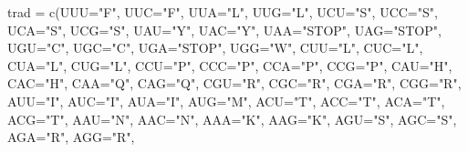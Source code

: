 \documentclass[
]{article}
\newenvironment{Shaded}{\begin{snugshade}}{\end{snugshade}}
\newcommand{\AttributeTok}[1]{\textcolor[rgb]{0.77,0.63,0.00}{#1}}
\newcommand{\FunctionTok}[1]{\textcolor[rgb]{0.00,0.00,0.00}{#1}}
\newcommand{\NormalTok}[1]{#1}
\newcommand{\OtherTok}[1]{\textcolor[rgb]{0.56,0.35,0.01}{#1}}
\newcommand{\StringTok}[1]{\textcolor[rgb]{0.31,0.60,0.02}{#1}}
\begin{document}
\newpage{}

\begin{Shaded}
\begin{Highlighting}[]
\NormalTok{trad }\OtherTok{=}    \FunctionTok{c}\NormalTok{(}\AttributeTok{UUU=}\StringTok{"F"}\NormalTok{, }\AttributeTok{UUC=}\StringTok{"F"}\NormalTok{, }\AttributeTok{UUA=}\StringTok{"L"}\NormalTok{, }\AttributeTok{UUG=}\StringTok{"L"}\NormalTok{,}
            \AttributeTok{UCU=}\StringTok{"S"}\NormalTok{, }\AttributeTok{UCC=}\StringTok{"S"}\NormalTok{, }\AttributeTok{UCA=}\StringTok{"S"}\NormalTok{, }\AttributeTok{UCG=}\StringTok{"S"}\NormalTok{,}
            \AttributeTok{UAU=}\StringTok{"Y"}\NormalTok{, }\AttributeTok{UAC=}\StringTok{"Y"}\NormalTok{, }\AttributeTok{UAA=}\StringTok{"STOP"}\NormalTok{, }\AttributeTok{UAG=}\StringTok{"STOP"}\NormalTok{,}
            \AttributeTok{UGU=}\StringTok{"C"}\NormalTok{, }\AttributeTok{UGC=}\StringTok{"C"}\NormalTok{, }\AttributeTok{UGA=}\StringTok{"STOP"}\NormalTok{, }\AttributeTok{UGG=}\StringTok{"W"}\NormalTok{,}
            \AttributeTok{CUU=}\StringTok{"L"}\NormalTok{, }\AttributeTok{CUC=}\StringTok{"L"}\NormalTok{, }\AttributeTok{CUA=}\StringTok{"L"}\NormalTok{, }\AttributeTok{CUG=}\StringTok{"L"}\NormalTok{,}
            \AttributeTok{CCU=}\StringTok{"P"}\NormalTok{, }\AttributeTok{CCC=}\StringTok{"P"}\NormalTok{, }\AttributeTok{CCA=}\StringTok{"P"}\NormalTok{, }\AttributeTok{CCG=}\StringTok{"P"}\NormalTok{,}
            \AttributeTok{CAU=}\StringTok{"H"}\NormalTok{, }\AttributeTok{CAC=}\StringTok{"H"}\NormalTok{, }\AttributeTok{CAA=}\StringTok{"Q"}\NormalTok{, }\AttributeTok{CAG=}\StringTok{"Q"}\NormalTok{,}
            \AttributeTok{CGU=}\StringTok{"R"}\NormalTok{, }\AttributeTok{CGC=}\StringTok{"R"}\NormalTok{, }\AttributeTok{CGA=}\StringTok{"R"}\NormalTok{, }\AttributeTok{CGG=}\StringTok{"R"}\NormalTok{,}
            \AttributeTok{AUU=}\StringTok{"I"}\NormalTok{, }\AttributeTok{AUC=}\StringTok{"I"}\NormalTok{, }\AttributeTok{AUA=}\StringTok{"I"}\NormalTok{, }\AttributeTok{AUG=}\StringTok{"M"}\NormalTok{,}
            \AttributeTok{ACU=}\StringTok{"T"}\NormalTok{, }\AttributeTok{ACC=}\StringTok{"T"}\NormalTok{, }\AttributeTok{ACA=}\StringTok{"T"}\NormalTok{, }\AttributeTok{ACG=}\StringTok{"T"}\NormalTok{,}
            \AttributeTok{AAU=}\StringTok{"N"}\NormalTok{, }\AttributeTok{AAC=}\StringTok{"N"}\NormalTok{, }\AttributeTok{AAA=}\StringTok{"K"}\NormalTok{, }\AttributeTok{AAG=}\StringTok{"K"}\NormalTok{,}
            \AttributeTok{AGU=}\StringTok{"S"}\NormalTok{, }\AttributeTok{AGC=}\StringTok{"S"}\NormalTok{, }\AttributeTok{AGA=}\StringTok{"R"}\NormalTok{, }\AttributeTok{AGG=}\StringTok{"R"}\NormalTok{,}

\end{Highlighting}
\end{Shaded}
\end{document}
